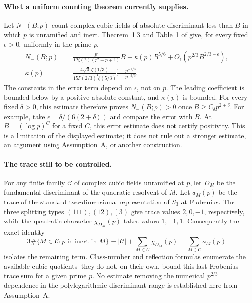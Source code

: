\documentclass[11pt]{article}
\theoremstyle{definition}
\theoremstyle{remark}
\begin{document}
\paragraph{What a uniform counting theorem currently supplies.}
Let $N_-(B;p)$ count complex cubic fields of absolute discriminant
less than $B$ in which $p$ is unramified and inert.
Theorem~1.3 and Table~1 of
\cite[pp.~2--3 of the checked author manuscript]
{BhargavaTaniguchiThorne2024}
give, for every fixed $\epsilon>0$, uniformly in the prime $p$,
\begin{align*}
 N_-(B;p)
 &=\frac{p^2}{12\zeta(3)(p^2+p+1)}B
   +\kappa(p)B^{5/6}
   +O_\epsilon\!\left(p^{2/3}B^{2/3+\epsilon}\right),\\
 \kappa(p)
 &=\frac{4\sqrt3\,\zeta(1/3)}
         {15\Gamma(2/3)^3\zeta(5/3)}
   \frac{1-p^{-1/3}}{1-p^{-5/3}}.
\end{align*}
The constants in the error term depend on $\epsilon$, not on $p$.
The leading coefficient is bounded below by a positive absolute
constant, and $\kappa(p)$ is bounded.
For every fixed $\delta>0$, this estimate therefore proves
$N_-(B;p)>0$ once $B\ge C_\delta p^{2+\delta}$.
For example, take
$\epsilon=\delta/(6(2+\delta))$ and compare the error with $B$.
At $B=(\log p)^C$ for a fixed $C$, this error estimate does not
certify positivity.
This is a limitation of the displayed estimate; it does not rule
out a stronger estimate, an argument using Assumption~A, or another
construction.

\paragraph{The trace still to be controlled.}
For any finite family $\mathcal C$ of complex cubic fields
unramified at $p$, let $D_M$ be the fundamental discriminant of
the quadratic resolvent of $M$.
Let $a_M(p)$ be the trace of the standard two-dimensional
representation of $S_3$ at Frobenius.
The three splitting types $(111),(12),(3)$ give trace values
$2,0,-1$, respectively, while the quadratic character
$\chi_{D_M}(p)$ takes values $1,-1,1$.
Consequently the exact identity
\[
 3\#\{M\in\mathcal C:p\text{ is inert in }M\}
 =|\mathcal C|+\sum_{M\in\mathcal C}\chi_{D_M}(p)
               -\sum_{M\in\mathcal C}a_M(p)
\]
isolates the remaining term.
Class-number and reflection formulas enumerate the available
cubic quotients; they do not, on their own, bound this last
Frobenius-trace sum for a given prime $p$.
No estimate removing the numerical $p^{2/3}$ dependence in the
polylogarithmic discriminant range is established here from
Assumption~A.
\end{document}
